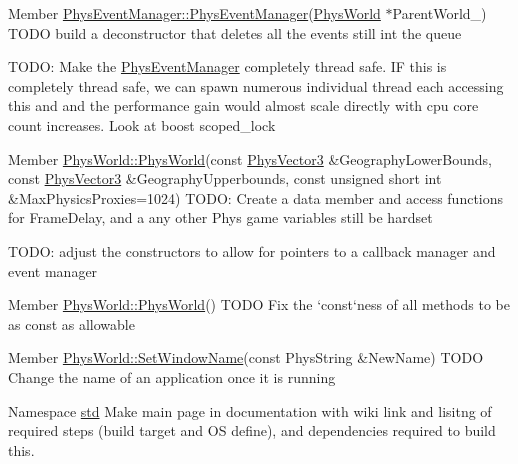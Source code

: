 \label{dd/da0/todo__todo000003}
\hypertarget{dd/da0/todo__todo000003}{}
 
\begin{DoxyDescription}
\item[Member \hyperlink{classPhysEventManager_a1355f36d99de303cec6f3b27cadaa9ff}{PhysEventManager::PhysEventManager}(\hyperlink{classPhysWorld}{PhysWorld} $\ast$ParentWorld\_\-) ]TODO build a deconstructor that deletes all the events still int the queue 

TODO: Make the \hyperlink{classPhysEventManager}{PhysEventManager} completely thread safe. IF this is completely thread safe, we can spawn numerous individual thread each accessing this and and the performance gain would almost scale directly with cpu core count increases. Look at boost scoped\_\-lock 
\end{DoxyDescription}

\label{dd/da0/todo__todo000013}
\hypertarget{dd/da0/todo__todo000013}{}
 
\begin{DoxyDescription}
\item[Member \hyperlink{classPhysWorld_a12892fd39d20cb671e23038d10ec4d94}{PhysWorld::PhysWorld}(const \hyperlink{classPhysVector3}{PhysVector3} \&GeographyLowerBounds, const \hyperlink{classPhysVector3}{PhysVector3} \&GeographyUpperbounds, const unsigned short int \&MaxPhysicsProxies=1024) ]TODO: Create a data member and access functions for FrameDelay, and a any other Phys game variables still be hardset 

TODO: adjust the constructors to allow for pointers to a callback manager and event manager 
\end{DoxyDescription}

\label{dd/da0/todo__todo000007}
\hypertarget{dd/da0/todo__todo000007}{}
 
\begin{DoxyDescription}
\item[Member \hyperlink{classPhysWorld_a6ded8026b0cd72e7877830698197adf0}{PhysWorld::PhysWorld}() ]TODO Fix the `const`ness of all methods to be as const as allowable 
\end{DoxyDescription}

\label{dd/da0/todo__todo000012}
\hypertarget{dd/da0/todo__todo000012}{}
 
\begin{DoxyDescription}
\item[Member \hyperlink{classPhysWorld_ac4ce341c1fc9a06f6265dcedc62f705b}{PhysWorld::SetWindowName}(const PhysString \&NewName) ]TODO Change the name of an application once it is running 
\end{DoxyDescription}

\label{dd/da0/todo__todo000001}
\hypertarget{dd/da0/todo__todo000001}{}
 
\begin{DoxyDescription}
\item[Namespace \hyperlink{namespacestd}{std} ]Make main page in documentation with wiki link and lisitng of required steps (build target and OS define), and dependencies required to build this. 
\end{DoxyDescription}